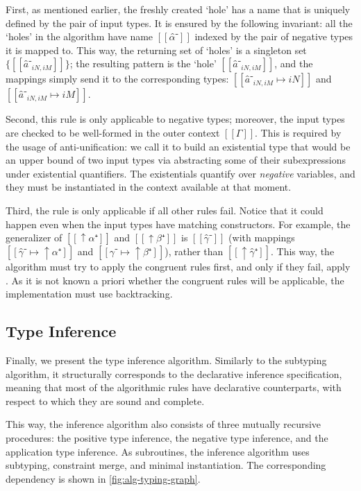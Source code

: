   First, as mentioned earlier, the freshly created `hole' has a name that is
  uniquely defined by the pair of input types. It is ensured by the following
  invariant: all the `holes' in the algorithm have name $[[α̂⁻]]$ indexed by the
  pair of negative types it is mapped to. This way, the returning set of `holes'
  is a singleton set $\{ [[ â⁻_{iN, iM} ]]\}$; the resulting pattern is the
  `hole' $[[â⁻_{iN, iM}]]$, and the mappings simply send it to the
  corresponding types: $[[â⁻_{iN, iM} ↦ iN]]$ and $[[â⁻_{iN, iM} ↦ iM]]$.

  Second, this rule is only applicable to negative types; moreover, the input
  types are checked to be well-formed in the outer context $[[Γ]]$. This is
  required by the usage of anti-unification: we call it to build an existential
  type that would be an upper bound of two input types via abstracting some of
  their subexpressions under existential quantifiers. The existentials quantify
  over \emph{negative} variables, and they must be instantiated in the context
  available at that moment.

  Third, the rule is only applicable if all other rules fail. Notice that it
  could happen even when the input types have matching constructors. For
  example, the generalizer of $[[↑α⁺]]$ and $[[↑β⁺]]$ is $[[γ̂⁻]]$ (with
  mappings $[[γ̂⁻ ↦ ↑α⁺]]$ and $[[γ̂⁻ ↦ ↑β⁺]]$), rather than $[[↑γ̂⁺]]$. This
  way, the algorithm must try to apply the congruent rules first, and only if
  they fail, apply . As it is not known a priori
  whether the congruent rules will be applicable, the implementation must use 
  backtracking.

\subsection{Type Inference}
\label{sec:typing}

Finally, we present the type inference algorithm. Similarly to the subtyping
algorithm, it structurally corresponds to the declarative inference
specification, meaning that most of the algorithmic rules have declarative
counterparts, with respect to which they are sound and complete.

This way, the inference algorithm also consists of three mutually recursive
procedures: the positive type inference, the negative type inference, and the
application type inference. As subroutines, the inference algorithm uses
subtyping, constraint merge, and minimal instantiation. The corresponding
dependency is shown in \cref{fig:alg-typing-graph}.

